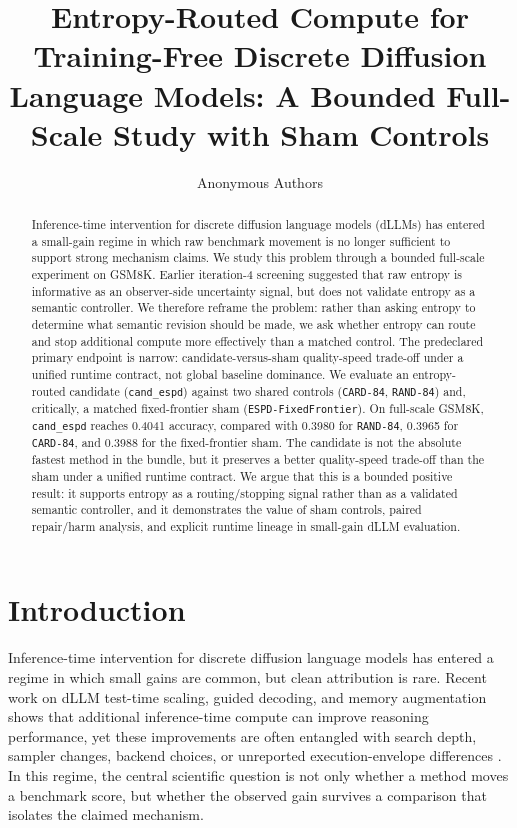 \documentclass{article}
\title{Entropy-Routed Compute for Training-Free Discrete Diffusion Language Models: A Bounded Full-Scale Study with Sham Controls}
\author{Anonymous Authors}
\begin{document}
\maketitle

\begin{abstract}
Inference-time intervention for discrete diffusion language models (dLLMs) has entered a small-gain regime in which raw benchmark movement is no longer sufficient to support strong mechanism claims. We study this problem through a bounded full-scale experiment on GSM8K. Earlier iteration-4 screening suggested that raw entropy is informative as an observer-side uncertainty signal, but does not validate entropy as a semantic controller. We therefore reframe the problem: rather than asking entropy to determine what semantic revision should be made, we ask whether entropy can route and stop additional compute more effectively than a matched control. The predeclared primary endpoint is narrow: candidate-versus-sham quality-speed trade-off under a unified runtime contract, not global baseline dominance. We evaluate an entropy-routed candidate (\texttt{cand\_espd}) against two shared controls (\texttt{CARD-84}, \texttt{RAND-84}) and, critically, a matched fixed-frontier sham (\texttt{ESPD-FixedFrontier}). On full-scale GSM8K, \texttt{cand\_espd} reaches 0.4041 accuracy, compared with 0.3980 for \texttt{RAND-84}, 0.3965 for \texttt{CARD-84}, and 0.3988 for the fixed-frontier sham. The candidate is not the absolute fastest method in the bundle, but it preserves a better quality-speed trade-off than the sham under a unified runtime contract. We argue that this is a bounded positive result: it supports entropy as a routing/stopping signal rather than as a validated semantic controller, and it demonstrates the value of sham controls, paired repair/harm analysis, and explicit runtime lineage in small-gain dLLM evaluation.
\end{abstract}

\section{Introduction}

Inference-time intervention for discrete diffusion language models has entered a regime in which small gains are common, but clean attribution is rare. Recent work on dLLM test-time scaling, guided decoding, and memory augmentation shows that additional inference-time compute can improve reasoning performance, yet these improvements are often entangled with search depth, sampler changes, backend choices, or unreported execution-envelope differences \citep{bai2026prism,lu2026block,xia2026metastate,samplercentric2026}. In this regime, the central scientific question is not only whether a method moves a benchmark score, but whether the observed gain survives a comparison that isolates the claimed mechanism.
\end{document}
